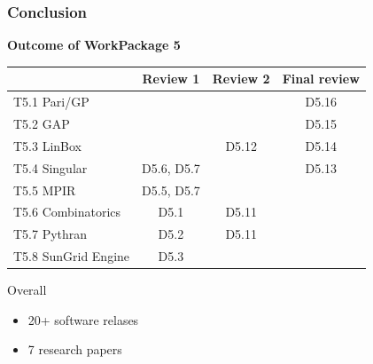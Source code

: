 \documentclass{beamer}
\begin{document}
    



\begin{frame}
  \frametitle{Conclusion}

  \textbf{Outcome of WorkPackage 5}
  \begin{center}
{\small
    \begin{tabular}{lccc}
    \toprule
        & Review 1 & Review 2 & Final review\\
    \midrule
    T5.1 Pari/GP & & & {\color{darkgreen} D5.16} \\
    T5.2 GAP     & & & {\color{darkgreen} D5.15} \\
    T5.3 LinBox  & & \alert{D5.12} & {\color{darkgreen} D5.14} \\
    T5.4 Singular& D5.6, D5.7 & & {\color{darkgreen} D5.13} \\
    T5.5 MPIR    & D5.5, D5.7& & \\
    T5.6 Combinatorics  & D5.1& \alert{D5.11} & \\
    T5.7 Pythran        & D5.2 & \alert{D5.11} & \\
    T5.8 SunGrid Engine & D5.3 & & \\
    \bottomrule
    
  \end{tabular}
}
  \end{center}
  
  Overall
  \begin{itemize}
  \item 20+ software relases
  \item 7 research papers
  \end{itemize}
\end{frame}
  
\end{document}
